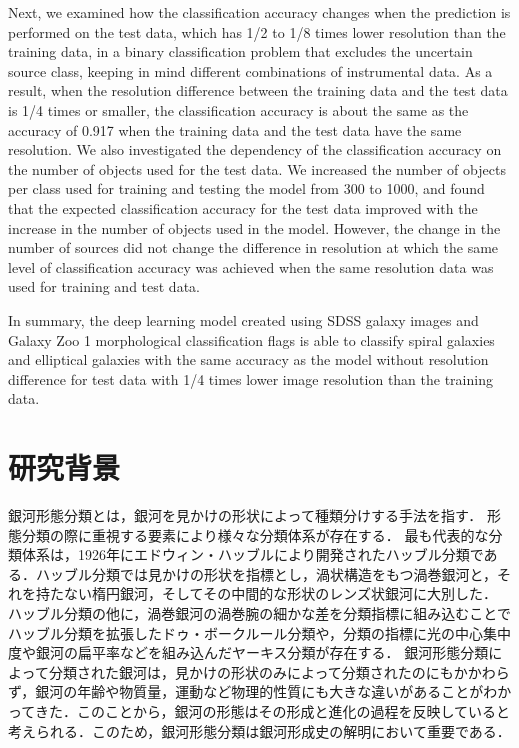 \documentclass[a4j, 11pt]{jreport}
\begin{document}
Next, we examined how the classification accuracy changes when the prediction is performed on the test data, which has 1/2 to 1/8 times lower resolution than the training data, in a binary classification problem that excludes the uncertain source class, keeping in mind different combinations of instrumental data. As a result, when the resolution difference between the training data and the test data is 1/4 times or smaller, the classification accuracy is about the same as the accuracy of 0.917 when the training data and the test data have the same resolution.
We also investigated the dependency of the classification accuracy on the number of objects used for the test data. We increased the number of objects per class used for training and testing the model from 300 to 1000, and found that the expected classification accuracy for the test data improved with the increase in the number of objects used in the model.
However, the change in the number of sources did not change the difference in resolution at which the same level of classification accuracy was achieved when the same resolution data was used for training and test data.

In summary, the deep learning model created using SDSS galaxy images and Galaxy Zoo 1 morphological classification flags is able to classify spiral galaxies and elliptical galaxies with the same accuracy as the model without resolution difference for test data with 1/4 times lower image resolution than the training data.


\newpage
\tableofcontents       %
\thispagestyle{empty}  %
\pagebreak
{} %


\chapter{研究背景}
銀河形態分類とは，銀河を見かけの形状によって種類分けする手法を指す．
形態分類の際に重視する要素により様々な分類体系が存在する．
最も代表的な分類体系は，1926年にエドウィン・ハッブルにより開発されたハッブル分類\cite{hubble1936}である．ハッブル分類では見かけの形状を指標とし，渦状構造をもつ渦巻銀河と，それを持たない楕円銀河，そしてその中間的な形状のレンズ状銀河に大別した．
ハッブル分類の他に，渦巻銀河の渦巻腕の細かな差を分類指標に組み込むことでハッブル分類を拡張したドゥ・ボークルール分類や，分類の指標に光の中心集中度や銀河の扁平率などを組み込んだヤーキス分類が存在する．
銀河形態分類によって分類された銀河は，見かけの形状のみによって分類されたのにもかかわらず，銀河の年齢や物質量，運動など物理的性質にも大きな違いがあることがわかってきた．このことから，銀河の形態はその形成と進化の過程を反映していると考えられる．このため，銀河形態分類は銀河形成史の解明において重要である．
\end{document}
